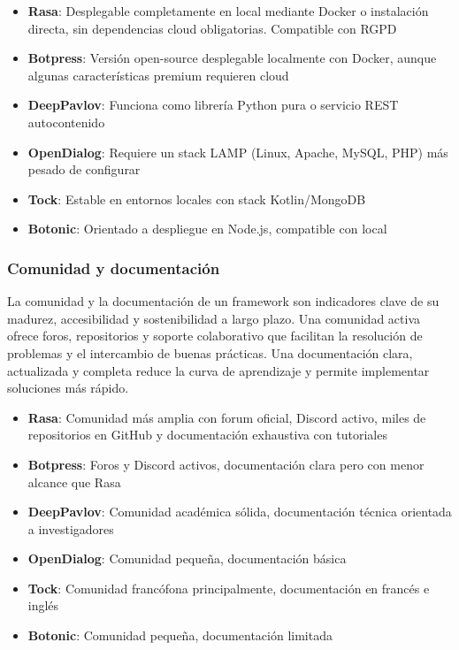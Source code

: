\begin{itemize}
    \item \textbf{Rasa}: Desplegable completamente en local mediante Docker o instalación directa, sin dependencias cloud obligatorias. Compatible con RGPD
    \item \textbf{Botpress}: Versión open-source desplegable localmente con Docker, aunque algunas características premium requieren cloud
    \item \textbf{DeepPavlov}: Funciona como librería Python pura o servicio REST autocontenido
    \item \textbf{OpenDialog}: Requiere un stack LAMP (Linux, Apache, MySQL, PHP) más pesado de configurar
    \item \textbf{Tock}: Estable en entornos locales con stack Kotlin/MongoDB
    \item \textbf{Botonic}: Orientado a despliegue en Node.js, compatible con local
\end{itemize}

\subsubsection{Comunidad y documentación}

La comunidad y la documentación de un framework son indicadores clave de su madurez, accesibilidad y sostenibilidad a largo plazo. Una comunidad activa ofrece foros, repositorios y soporte colaborativo que facilitan la resolución de problemas y el intercambio de buenas prácticas. Una documentación clara, actualizada y completa reduce la curva de aprendizaje y permite implementar soluciones más rápido.

\begin{itemize}
    \item \textbf{Rasa}: Comunidad más amplia con forum oficial, Discord activo, miles de repositorios en GitHub y documentación exhaustiva con tutoriales
    \item \textbf{Botpress}: Foros y Discord activos, documentación clara pero con menor alcance que Rasa
    \item \textbf{DeepPavlov}: Comunidad académica sólida, documentación técnica orientada a investigadores
    \item \textbf{OpenDialog}: Comunidad pequeña, documentación básica
    \item \textbf{Tock}: Comunidad francófona principalmente, documentación en francés e inglés
    \item \textbf{Botonic}: Comunidad pequeña, documentación limitada
\end{itemize}

